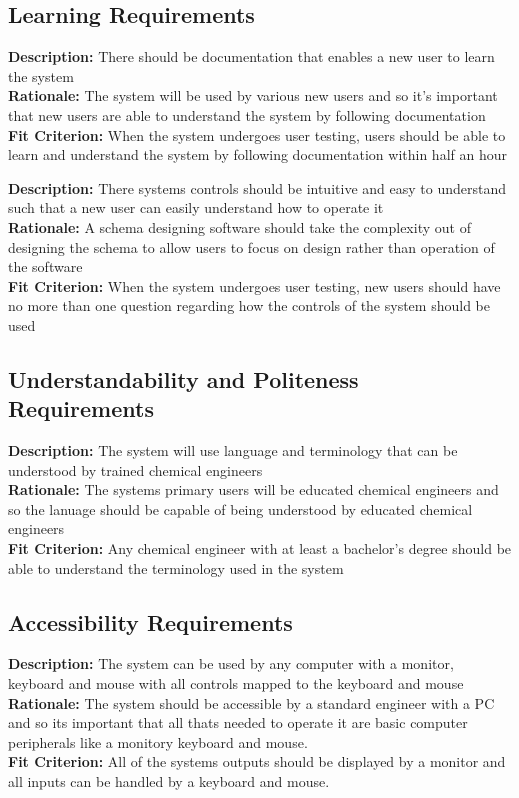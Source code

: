 \documentclass[12pt]{article}
\begin{document}
\subsection{Learning Requirements}
\begin{tcolorbox}[title=UHL1]
  \textbf{Description:} There should be documentation that enables a new user to learn the system \\
  \textbf{Rationale:} The system will be used by various new users and so it's important that new users are able to understand the system by following documentation\\
  \textbf{Fit Criterion:} When the system undergoes user testing, users should be able to learn and understand the system by following documentation within half an hour 
\end{tcolorbox}
\begin{tcolorbox}[title=UHL2]
  \textbf{Description:} There systems controls should be intuitive and easy to understand such that a new user can easily understand how to operate it\\
  \textbf{Rationale:} A schema designing software should take the complexity out of designing the schema to allow users to focus on design rather than operation of the software\\
  \textbf{Fit Criterion:} When the system undergoes user testing, new users should have no more than one question regarding how the controls of the system should be used
\end{tcolorbox}
\subsection{Understandability and Politeness Requirements}
\begin{tcolorbox}[title=UHU1]
  \textbf{Description:} The system will use language and terminology that can be understood by trained chemical engineers \\
  \textbf{Rationale:} The systems primary users will be educated chemical engineers and so the lanuage should be capable of being understood by educated chemical engineers\\
  \textbf{Fit Criterion:} Any chemical engineer with at least a bachelor's degree should be able to understand the terminology used in the system 
\end{tcolorbox}
\subsection{Accessibility Requirements}
\begin{tcolorbox}[title=UHA1]
  \textbf{Description:} The system can be used by any computer with a monitor, keyboard and mouse with all controls mapped to the keyboard and mouse \\
  \textbf{Rationale:} The system should be accessible by a standard engineer with a PC and so its important that all thats needed to operate it are basic computer peripherals like a  monitory keyboard and mouse. \\
  \textbf{Fit Criterion:} All of the systems outputs should be displayed by a monitor and all inputs can be handled by a keyboard and mouse. 
\end{tcolorbox}
\end{document}
